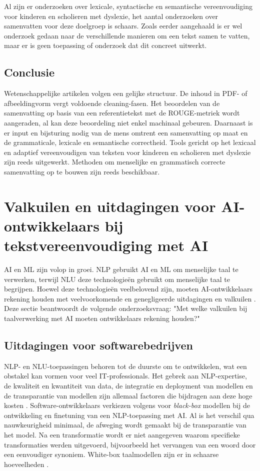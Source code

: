 Al zijn er onderzoeken over lexicale, syntactische en semantische vereenvoudiging voor kinderen en scholieren met dyslexie, het aantal onderzoeken over samenvatten voor deze doelgroep is schaars. Zoals eerder aangehaald is er wel onderzoek gedaan naar de verschillende manieren om een tekst samen te vatten, maar er is geen toepassing of onderzoek dat dit concreet uitwerkt. 

\subsection{Conclusie}

Wetenschappelijke artikelen volgen een gelijke structuur. De inhoud in PDF- of afbeeldingvorm vergt voldoende cleaning-fasen. Het beoordelen van de samenvatting op basis van een referentietekst met de ROUGE-metriek wordt aangeraden, al kan deze beoordeling niet enkel machinaal gebeuren. Daarnaast is er input en bijsturing nodig van de mens omtrent een samenvatting op maat en de grammaticale, lexicale en semantische correctheid. Tools gericht op het lexicaal en adaptief vereenvoudigen van teksten voor kinderen en scholieren met dyslexie zijn reeds uitgewerkt. Methoden om menselijke en grammatisch correcte samenvatting op te bouwen zijn reeds beschikbaar. 

\section{Valkuilen en uitdagingen voor AI-ontwikkelaars bij tekstvereenvoudiging met AI}

AI en ML zijn volop in groei. NLP gebruikt AI en ML om menselijke taal te verwerken, terwijl NLU deze technologieën gebruikt om menselijke taal te begrijpen. Hoewel deze technologieën veelbelovend zijn, moeten AI-ontwikkelaars rekening houden met veelvoorkomende en genegligeerde uitdagingen en valkuilen \autocite{Sciforce2020, Roldos2020, Khurana2022}. Deze sectie beantwoordt de volgende onderzoeksvraag: "Met welke valkuilen bij taalverwerking met AI moeten ontwikkelaars rekening houden?"

\subsection{Uitdagingen voor softwarebedrijven}

NLP- en NLU-toepassingen behoren tot de duurste om te ontwikkelen, wat een obstakel kan vormen voor veel IT-professionals. Het gebrek aan NLP-expertise, de kwaliteit en kwantiteit van data, de integratie en deployment van modellen en de transparantie van modellen zijn allemaal factoren die bijdragen aan deze hoge kosten \autocite{IBM2022}. Software-ontwikkelaars verkiezen volgens  voor \textit{black-box} modellen bij de ontwikkeling en finetuning van een NLP-toepassing met AI. Al is het verschil qua nauwkeurigheid minimaal, de afweging wordt gemaakt bij de transparantie van het model. Na een transformatie wordt er niet aangegeven waarom specifieke transformaties werden uitgevoerd, bijvoorbeeld het vervangen van een woord door een eenvoudiger synoniem. White-box taalmodellen zijn er in schaarse hoeveelheden \autocite{Punardeep2020}. 


